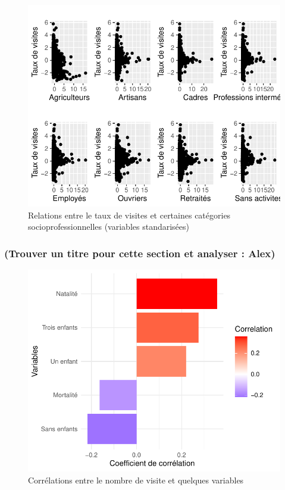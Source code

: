 \documentclass[
]{article}
\begin{document}
\begin{figure}

{\centering \includegraphics{rapport_intermediaire_files/figure-latex/unnamed-chunk-23-1} 

}

\caption{Relations entre le taux de visites et certaines catégories socioprofessionnelles (variables standarisées)}\label{fig:unnamed-chunk-23}
\end{figure}

\hypertarget{trouver-un-titre-pour-cette-section-et-analyser-alex}{%
\subsubsection{(Trouver un titre pour cette section et analyser :
Alex)}\label{trouver-un-titre-pour-cette-section-et-analyser-alex}}

\begin{figure}

{\centering \includegraphics{rapport_intermediaire_files/figure-latex/unnamed-chunk-24-1} 

}

\caption{Corrélations entre le nombre de visite et quelques variables}\label{fig:unnamed-chunk-24}
\end{figure}
\end{document}
